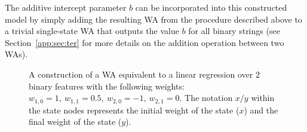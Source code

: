 


The additive intercept parameter $b$ can be incorporated into this constructed model by simply adding the resulting WA from the procedure described above to a trivial single-state WA that outputs the value $b$ for all binary strings (see Section~\ref{app:sec:ter} for more details on the addition operation between two WAs).

\begin{figure}[h]
    \centering
    \caption{A construction of a WA equivalent to a linear regression over $2$ binary features with the following weights: $w_{1,0} = 1,~w_{1,1}=0.5,~w_{2,0}=-1,~w_{2,1}=0$. The notation $x/y$ within the state nodes represents the initial weight of the state ($x$) and the final weight of the state ($y$).
    }
    \label{app:fig:lin2wa}
\end{figure}


